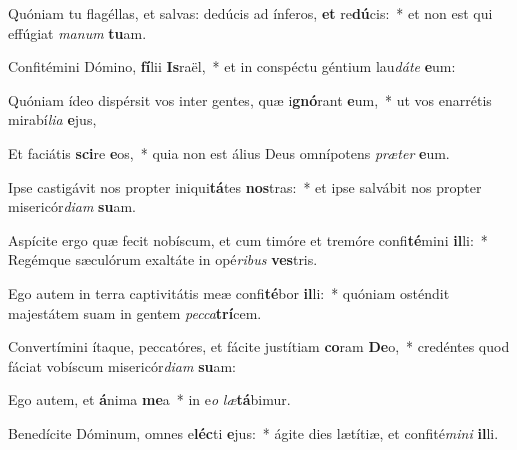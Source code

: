 \item Quóniam tu flagéllas, et salvas: dedúcis ad ínferos, \textbf{et} re\textbf{dú}cis:~* et non est qui effúgiat \textit{ma}\textit{num} \textbf{tu}am.
\item Confitémini Dómino, \textbf{fí}lii \textbf{Is}raël,~* et in conspéctu géntium lau\textit{dá}\textit{te} \textbf{e}um:
\item Quóniam ídeo dispérsit vos inter gentes, quæ i\textbf{gnó}rant \textbf{e}um,~* ut vos enarrétis mirabí\textit{li}\textit{a} \textbf{e}jus,
\item Et faciátis \textbf{sci}re \textbf{e}os,~* quia non est álius Deus omnípotens \textit{præ}\textit{ter} \textbf{e}um.
\item Ipse castigávit nos propter iniqui\textbf{tá}tes \textbf{nos}tras:~* et ipse salvábit nos propter misericór\textit{di}\textit{am} \textbf{su}am.
\item Aspícite ergo quæ fecit nobíscum, et cum timóre et tremóre confi\textbf{té}mini \textbf{il}li:~* Regémque sæculórum exaltáte in opé\textit{ri}\textit{bus} \textbf{ves}tris.
\item Ego autem in terra captivitátis meæ confi\textbf{té}bor \textbf{il}li:~* quóniam osténdit majestátem suam in gentem \textit{pec}\textit{ca}\textbf{trí}cem.
\item Convertímini ítaque, peccatóres, et fácite justítiam \textbf{co}ram \textbf{De}o,~* credéntes quod fáciat vobíscum misericór\textit{di}\textit{am} \textbf{su}am:
\item Ego autem, et \textbf{á}nima \textbf{me}a~* in e\textit{o} \textit{læ}\textbf{tá}bimur.
\item Benedícite Dóminum, omnes e\textbf{léc}ti \textbf{e}jus:~* ágite dies lætítiæ, et confité\textit{mi}\textit{ni} \textbf{il}li.
